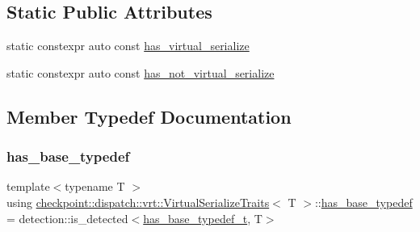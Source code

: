 \subsection*{Static Public Attributes}
\begin{DoxyCompactItemize}
\item 
static constexpr auto const \hyperlink{structcheckpoint_1_1dispatch_1_1vrt_1_1_virtual_serialize_traits_a21d83fdae98269101791620d64160887}{has\+\_\+virtual\+\_\+serialize}
\item 
static constexpr auto const \hyperlink{structcheckpoint_1_1dispatch_1_1vrt_1_1_virtual_serialize_traits_a97ce9c5581f6ff66cbc91d5ca5750e2f}{has\+\_\+not\+\_\+virtual\+\_\+serialize}
\end{DoxyCompactItemize}


\subsection{Member Typedef Documentation}
\mbox{\label{structcheckpoint_1_1dispatch_1_1vrt_1_1_virtual_serialize_traits_a5ef65f047ffa20ed206485238ceb2af5}} 
\subsubsection{\texorpdfstring{has\+\_\+base\+\_\+typedef}{has\_base\_typedef}}
{\footnotesize\ttfamily template$<$typename T $>$ \\
using \hyperlink{structcheckpoint_1_1dispatch_1_1vrt_1_1_virtual_serialize_traits}{checkpoint\+::dispatch\+::vrt\+::\+Virtual\+Serialize\+Traits}$<$ T $>$\+::\hyperlink{structcheckpoint_1_1dispatch_1_1vrt_1_1_virtual_serialize_traits_a5ef65f047ffa20ed206485238ceb2af5}{has\+\_\+base\+\_\+typedef} =  detection\+::is\+\_\+detected$<$\hyperlink{structcheckpoint_1_1dispatch_1_1vrt_1_1_virtual_serialize_traits_a900e9fcb655c36ab48fd6db0f0258b75}{has\+\_\+base\+\_\+typedef\+\_\+t}, T$>$}

\mbox{\label{structcheckpoint_1_1dispatch_1_1vrt_1_1_virtual_serialize_traits_a900e9fcb655c36ab48fd6db0f0258b75}} 

